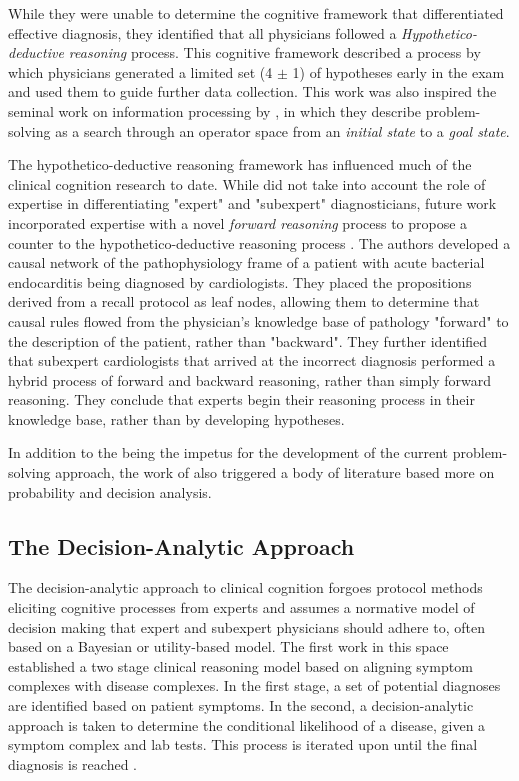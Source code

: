 
While they were unable to determine the cognitive framework that differentiated effective diagnosis, they identified that all physicians followed a \emph{Hypothetico-deductive reasoning} process. This cognitive framework described a process by which physicians generated a limited set (4 $\pm$ 1) of hypotheses early in the exam and used them to guide further data collection. This work was also inspired the seminal work on information processing by \citet{simonHumanProblemSolving1971}, in which they describe problem-solving as a search through an operator space from an \emph{initial state} to a \emph{goal state}. 

The hypothetico-deductive reasoning framework has influenced much of the clinical cognition research to date. While \citet*{elstein1978medical} did not take into account the role of expertise in differentiating "expert" and "subexpert" diagnosticians, future work incorporated expertise with a novel \emph{forward reasoning} process to propose a counter to the hypothetico-deductive reasoning process \citep{patelKnowledgeBasedSolution1986}. The authors developed a causal network of the pathophysiology frame of a patient with acute bacterial endocarditis being diagnosed by cardiologists. They placed the propositions derived from a recall protocol as leaf nodes, allowing them to determine that causal rules flowed from the physician's knowledge base of pathology "forward" to the description of the patient, rather than "backward". They further identified that subexpert cardiologists that arrived at the incorrect diagnosis performed a hybrid process of forward and backward reasoning, rather than simply forward reasoning. They conclude that experts begin their reasoning process in their knowledge base, rather than by developing hypotheses. 



In addition to the being the impetus for the development of the current problem-solving approach, the work of \citet*{elstein1978medical} also triggered a body of literature based more on probability and decision analysis. 

\subsection{The Decision-Analytic Approach}
The decision-analytic approach to clinical cognition forgoes protocol methods eliciting cognitive processes from experts and assumes a normative model of decision making that expert and subexpert physicians should adhere to, often based on a Bayesian or utility-based model. The first work in this space established a two stage clinical reasoning model based on aligning symptom complexes with disease complexes. In the first stage, a set of potential diagnoses are identified based on patient symptoms. In the second, a decision-analytic approach is taken to determine the conditional likelihood of a disease, given a symptom complex and lab tests. This process is iterated upon until the final diagnosis is reached \citep{ledley1959reasoning}. 

